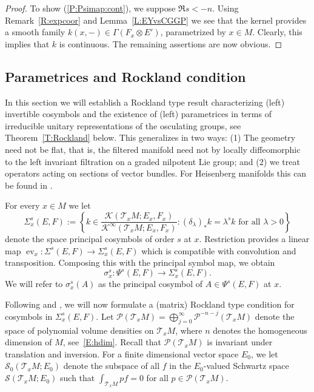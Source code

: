 \documentclass[reqno,12pt]{amsart}
\DeclareMathOperator{\ev}{ev}
\newcommand\itemref[1]{(\ref{#1})}
\theoremstyle{plain}
\theoremstyle{definition}
\begin{document}
\begin{proof}
To show \itemref{P:Psimap:cont}, we suppose $\Re s<-n$.
Using Remark~\ref{R:expcoor} and Lemma~\ref{L:EYvsCGGP} we see that the kernel provides a smooth family $k(x,-)\in\Gamma(F_x\otimes E')$, parametrized by $x\in M$.
Clearly, this implies that $k$ is continuous.
The remaining assertions are now obvious.
\end{proof}





\subsection{Parametrices and Rockland condition}\label{SS:para}




In this section we will establish a Rockland \cite{R78} type result characterizing (left) invertible cosymbols and the existence of (left) parametrices in terms of irreducible unitary representations of the osculating groups, see Theorem~\ref{T:Rockland} below.
This generalizes \cite[Theorem~2.5(d)]{CGGP92} in two ways: (1) The geometry need not be flat, that is, the filtered manifold need not by locally diffeomorphic to the left invariant filtration on a graded nilpotent Lie group; and (2) we treat operators acting on sections of vector bundles.
For Heisenberg manifolds this can be found in \cite[Theorems~3.3.10 and 5.4.1]{P08}.


For every $x\in M$ we let
$$
\Sigma_x^s(E,F):=
\left\{k\in\frac{\mathcal K(\mathcal T_xM;E_x,F_x)}{\mathcal K^\infty(\mathcal T_xM;E_x,F_x)}:\textrm{$(\delta_\lambda)_*k=\lambda^sk$ for all $\lambda>0$}\right\}
$$
denote the space principal cosymbols of order $s$ at $x$.
Restriction provides a linear map $\ev_x\colon\Sigma^s(E,F)\to\Sigma^s_x(E,F)$ which is compatible with convolution and transposition.
Composing this with the principal symbol map, we obtain 
$$
\sigma^s_x\colon\Psi^s(E,F)\to\Sigma^s_x(E,F).
$$
We will refer to $\sigma^s_x(A)$ as the principal cosymbol of $A\in\Psi^s(E,F)$ at $x$.


Following \cite{CGGP92} and \cite[Section~3.3.2]{P08}, we will now formulate a (matrix) Rockland type condition for cosymbols in $\Sigma_x^s(E,F)$.
Let $\mathcal P(\mathcal T_xM)=\bigoplus_{j=0}^\infty\mathcal P^{-n-j}(\mathcal T_xM)$ denote the space of polynomial volume densities on $\mathcal T_xM$, where $n$ denotes the homogeneous dimension of $M$, see~\eqref{E:hdim}.
Recall that $\mathcal P(\mathcal T_xM)$ is invariant under translation and inversion.
For a finite dimensional vector space $E_0$, we let $\mathcal S_0(\mathcal T_xM;E_0)$ denote the subspace of all $f$ in the $E_0$-valued Schwartz space $\mathcal S(\mathcal T_xM;E_0)$ such that $\int_{\mathcal T_xM}pf=0$ for all $p\in\mathcal P(\mathcal T_xM)$.
\end{document}
